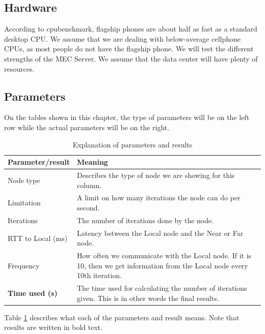 \subsection{Hardware}
According to cpubenchmark\cite{noauthor_passmark_nodate}, flagship phones are about half as fast as a standard desktop CPU. We assume that we are dealing with below-average cellphone CPUs, as most people do not have the flagship phone. We will test the different strengths of the MEC Server. We assume that the data center will have plenty of resources. 


\subsection{Parameters}
On the tables shown in this chapter, the type of parameters will be on the left row while the actual parameters will be on the right.
\renewcommand{\arraystretch}{1.5}
\begin{table}[h!]
    \centering
    \begin{tabular}{l|p{12cm}}
        
        Parameter/\textbf{result} &  Meaning\\
        \hline
        Node type & Describes the type of node we are showing for this column. \\

        Limitation & A limit on how many iterations the node can do per second. \\

        Iterations & The number of iterations done by the node. \\

        RTT to Local (ms) & Latency between the Local node and the Near or Far node. \\
        
        Frequency & How often we communicate with the Local node. If it is 10, then we get information from the Local node every 10th iteration. \\
        \hline
        \textbf{Time used (s)} & The time used for calculating the number of iterations given. This is in other words the final results. \\
    \end{tabular}
    \caption{Explanation of parameters and results}
    \label{tab:parameter_explanation}
\end{table}
\renewcommand{\arraystretch}{1.2}

Table \ref{tab:parameter_explanation} describes what each of the parameters and result means. Note that results are written in bold text.

